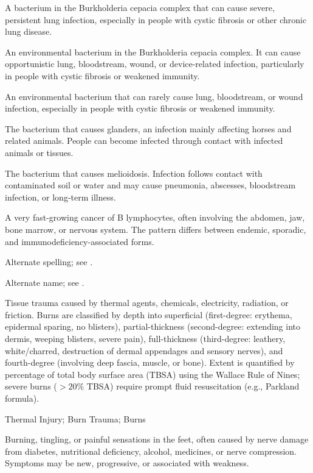  A bacterium in the Burkholderia cepacia complex that can cause severe, persistent lung infection, especially in people with cystic fibrosis or other chronic lung disease.

 An environmental bacterium in the Burkholderia cepacia complex. It can cause opportunistic lung, bloodstream, wound, or device-related infection, particularly in people with cystic fibrosis or weakened immunity.

 An environmental bacterium that can rarely cause lung, bloodstream, or wound infection, especially in people with cystic fibrosis or weakened immunity.

 The bacterium that causes glanders, an infection mainly affecting horses and related animals. People can become infected through contact with infected animals or tissues.

 The bacterium that causes melioidosis. Infection follows contact with contaminated soil or water and may cause pneumonia, abscesses, bloodstream infection, or long-term illness.

 A very fast-growing cancer of B lymphocytes, often involving the abdomen, jaw, bone marrow, or nervous system. The pattern differs between endemic, sporadic, and immunodeficiency-associated forms.

 Alternate spelling; see .

 Alternate name; see .

 Tissue trauma caused by thermal agents, chemicals, electricity, radiation, or friction. Burns are classified by depth into superficial (first-degree: erythema, epidermal sparing, no blisters), partial-thickness (second-degree: extending into dermis, weeping blisters, severe pain), full-thickness (third-degree: leathery, white/charred, destruction of dermal appendages and sensory nerves), and fourth-degree (involving deep fascia, muscle, or bone). Extent is quantified by percentage of total body surface area (TBSA) using the Wallace Rule of Nines; severe burns ($> 20\%$ TBSA) require prompt fluid resuscitation (e.g., Parkland formula).

\synonyms
Thermal Injury; Burn Trauma; Burns

 Burning, tingling, or painful sensations in the feet, often caused by nerve damage from diabetes, nutritional deficiency, alcohol, medicines, or nerve compression. Symptoms may be new, progressive, or associated with weakness.

